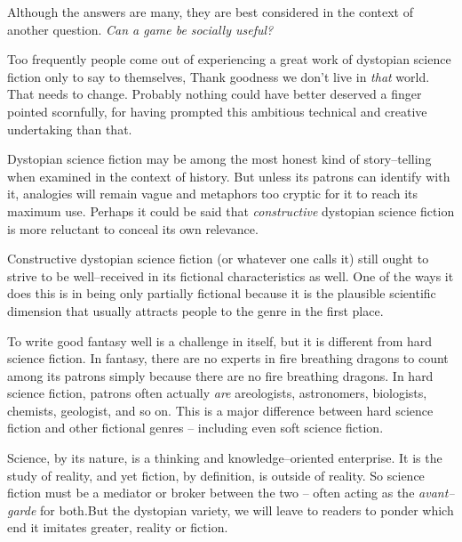 

Although the answers are many, they are best considered in the context of another question. {\it Can a game be socially useful?}

Too frequently people come out of experiencing a great work of dystopian science fiction only to say to themselves, Thank goodness we don't live in {\it that} world. That needs to change. Probably nothing could have better deserved a finger pointed scornfully, for having prompted this ambitious technical and creative undertaking than that.

Dystopian science fiction may be among the most honest kind of story--telling when examined in the context of history. But unless its patrons can identify with it, analogies will remain vague and metaphors too cryptic for it to reach its maximum use. Perhaps it could be said that {\it constructive} dystopian science fiction is more reluctant to conceal its own relevance.

    {}

Constructive dystopian science fiction (or whatever one calls it) still ought to strive to be well--received in its fictional characteristics as well. One of the ways it does this is in being only partially fictional because it is the plausible scientific dimension that usually attracts people to the genre in the first place.

To write good fantasy well is a challenge in itself, but it is different from hard science fiction. In fantasy, there are no experts in fire breathing dragons to count among its patrons simply because there are no fire breathing dragons. In hard science fiction, patrons often actually {\it are} areologists, astronomers, biologists, chemists, geologist, and so on. This is a major difference between hard science fiction and other fictional genres -- including even soft science fiction. 

Science, by its nature, is a thinking and knowledge--oriented enterprise. It is the study of reality, and yet fiction, by definition, is outside of reality. So science fiction must be a mediator or broker between the two -- often acting as the {\it avant--garde} for both.\footnotecite[shedroff2012] But the dystopian variety, we will leave to readers to ponder which end it imitates greater, reality or fiction.

